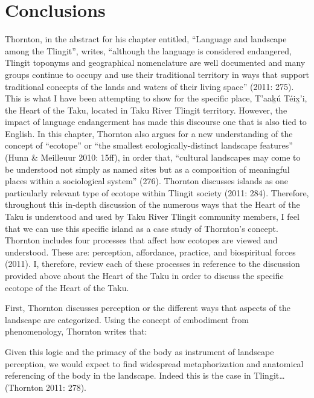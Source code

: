 \section{Conclusions}

Thornton, in the abstract for his chapter entitled, “Language and landscape among the Tlingit”, writes, “although the language is considered endangered, Tlingit toponyms and geographical nomenclature are well documented and many groups continue to occupy and use their traditional territory in ways that support traditional concepts of the lands and waters of their living space” (2011: 275). This is what I have been attempting to show for the specific place, T'aak̲ú Téix̲'i, the Heart of the Taku, located in Taku River Tlingit territory. However, the impact of language endangerment has made this discourse one that is also tied to English. In this chapter, Thornton also argues for a new understanding of the concept of “ecotope” or “the smallest ecologically-distinct landscape features” (Hunn \& Meilleuur 2010: 15ff), in order that, “cultural landscapes may come to be understood not simply as named sites but as a composition of meaningful places within a sociological system” (276). Thornton discusses islands as one particularly relevant type of ecotope within Tlingit society (2011: 284). Therefore, throughout this in-depth discussion of the numerous ways that the Heart of the Taku is understood and used by Taku River Tlingit community members, I feel that we can use this specific island as a case study of Thornton’s concept. Thornton includes four processes that affect how ecotopes are viewed and understood. These are: perception, affordance, practice, and biospiritual forces (2011). I, therefore, review each of these processes in reference to the discussion provided above about the Heart of the Taku in order to discuss the specific ecotope of the Heart of the Taku.

First, Thornton discusses perception or the different ways that aspects of the landscape are categorized. Using the concept of embodiment from phenomenology, Thornton writes that:

Given this logic and the primacy of the body as instrument of landscape perception, we would expect to find widespread metaphorization and anatomical referencing of the body in the landscape. Indeed this is the case in Tlingit… (Thornton 2011: 278).

